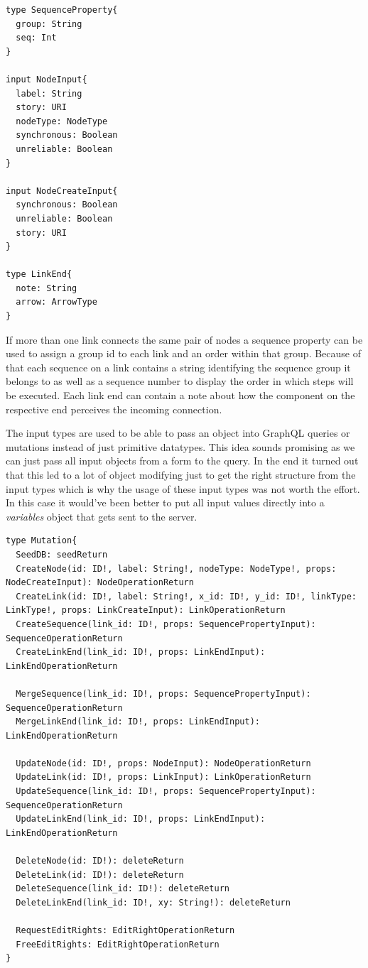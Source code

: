 \begin{lstlisting}[caption={Input Type Definitions}]
type SequenceProperty{
  group: String
  seq: Int
}

input NodeInput{
  label: String
  story: URI
  nodeType: NodeType
  synchronous: Boolean
  unreliable: Boolean
}

input NodeCreateInput{
  synchronous: Boolean
  unreliable: Boolean
  story: URI
}

type LinkEnd{
  note: String
  arrow: ArrowType
}
\end{lstlisting}
If more than one link connects the same pair of nodes a sequence property can be used to assign a group id to each link and an order within that group. Because of that each sequence on a link contains a string identifying the sequence group it belongs to as well as a sequence number to display the order in which steps will be executed. Each link end can contain a note about how the component on the respective end perceives the incoming connection.

The input types are used to be able to pass an object into GraphQL queries or mutations instead of just primitive datatypes. This idea sounds promising as we can just pass all input objects from a form to the query. In the end it turned out that this led to a lot of object modifying just to get the right structure from the input types which is why the usage of these input types was not worth the effort. In this case it would've been better to put all input values directly into a \emph{variables} object that gets sent to the server.

\begin{lstlisting}[caption={Mutation Type Definition},label={mutations}]
type Mutation{
  SeedDB: seedReturn
  CreateNode(id: ID!, label: String!, nodeType: NodeType!, props: NodeCreateInput): NodeOperationReturn
  CreateLink(id: ID!, label: String!, x_id: ID!, y_id: ID!, linkType: LinkType!, props: LinkCreateInput): LinkOperationReturn
  CreateSequence(link_id: ID!, props: SequencePropertyInput): SequenceOperationReturn
  CreateLinkEnd(link_id: ID!, props: LinkEndInput): LinkEndOperationReturn

  MergeSequence(link_id: ID!, props: SequencePropertyInput): SequenceOperationReturn
  MergeLinkEnd(link_id: ID!, props: LinkEndInput): LinkEndOperationReturn

  UpdateNode(id: ID!, props: NodeInput): NodeOperationReturn
  UpdateLink(id: ID!, props: LinkInput): LinkOperationReturn
  UpdateSequence(link_id: ID!, props: SequencePropertyInput): SequenceOperationReturn
  UpdateLinkEnd(link_id: ID!, props: LinkEndInput): LinkEndOperationReturn

  DeleteNode(id: ID!): deleteReturn
  DeleteLink(id: ID!): deleteReturn
  DeleteSequence(link_id: ID!): deleteReturn
  DeleteLinkEnd(link_id: ID!, xy: String!): deleteReturn

  RequestEditRights: EditRightOperationReturn
  FreeEditRights: EditRightOperationReturn
}
\end{lstlisting}


